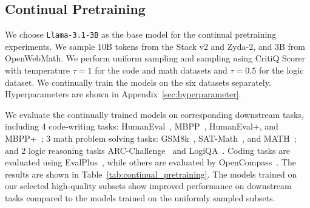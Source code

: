 \subsection{Continual Pretraining}

We choose \texttt{Llama-3.1-3B} as the base model for the continual pretraining experiments.
We sample 10B tokens from the Stack v2 and Zyda-2, and 3B from OpenWebMath. We
perform uniform sampling and sampling using CritiQ Scorer with temperature
$\tau=1$ for the code and math datasets and $\tau=0.5$ for the logic dataset.
We continually train the models on the six datasets separately. Hyperparameters
are shown in Appendix~\ref{sec:hyperparameter}.

We evaluate the continually trained models on corresponding downstream tasks, including
4 code-writing tasks: HumanEval~\citep{chen_evaluating_2021}, MBPP~\citep{austin_program_2021},
HumanEval+, and MBPP+~\citep{liu_is_2023}; 3 math problem solving tasks: GSM8k~\citep{cobbe_training_2021},
SAT-Math~\citep{zhong_agieval_2023}, and MATH~\citep{hendrycks_measuring_2021};
and 2 logic reasoning tasks ARC-Challenge~\citep{clark_think_2018} and LogiQA~\citep{zhong_agieval_2023}.
Coding tasks are evaluated using EvalPlus~\citep{liu_is_2023}, while others are evaluated
by OpenCompass~\citep{2023opencompass}. The results are shown in Table~\ref{tab:continual_pretraining}.
The models trained on our selected high-quality subsets show improved
performance on downstream tasks compared to the models trained on the uniformly
sampled subsets.

